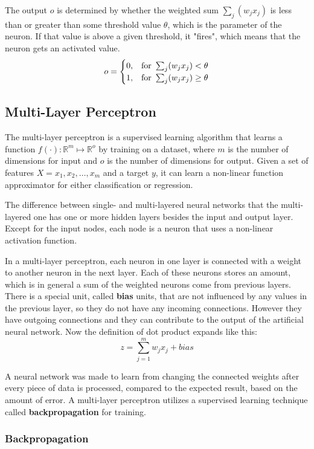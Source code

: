 The output $o$ is determined by whether the weighted sum $\sum_j(w_j x_j)$ is less than or greater than some threshold value $\theta$, which is the parameter of the neuron. If that value is above a given threshold, it "fires", which means that the neuron gets an activated value. 
$$ o = \begin{cases} 0, & \hbox{for}~ \sum_j(w_j x_j) < \theta \\ 1, & \hbox{for}~ \sum_j(w_j x_j) \geq \theta \end{cases} $$



\subsection{Multi-Layer Perceptron}

The multi-layer perceptron is a supervised learning algorithm that learns a function $f(\cdot) : \mathbb{R}^m \mapsto \mathbb{R}^o$ by training on a dataset, where $m$ is the number of dimensions for input and $o$ is the number of dimensions for output. Given a set of features $X = x_1, x_2, \dots, x_m$ and a target $y$, it can learn a non-linear function approximator for either classification or regression. \medskip

The difference between single- and multi-layered neural networks that the multi-layered one has one or more hidden layers besides the input and output layer. Except for the input nodes, each node is a neuron that uses a non-linear activation function. \medskip

In a multi-layer perceptron, each neuron in one layer is connected with a weight to another neuron in the next layer. Each of these neurons stores an amount, which is in general a sum of the weighted neurons come from previous layers. There is a special unit, called \textbf{bias} units, that are not influenced by any values in the previous layer, so they do not have any incoming connections. However they have outgoing connections and they can contribute to the output of the artificial neural network. Now the definition of dot product expands like this:
$$ z = \sum_{j=1}^m w_j x_j + bias $$

A neural network was made to learn from changing the connected weights after every piece of data is processed, compared to the expected result, based on the amount of error. A multi-layer perceptron utilizes a supervised learning technique called \textbf{backpropagation} for training.


\subsubsection{Backpropagation}

